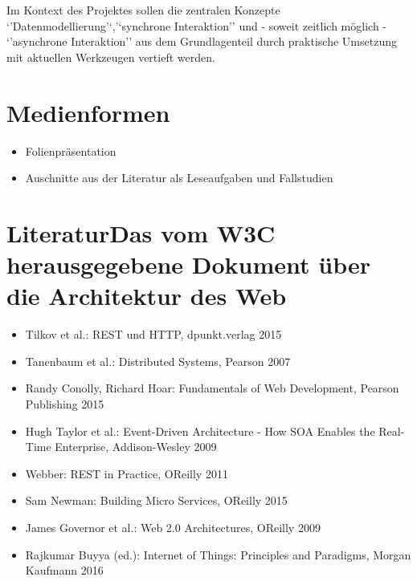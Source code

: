 Im Kontext des Projektes sollen die zentralen Konzepte
`'Datenmodellierung'`,'`synchrone Interaktion'' und - soweit zeitlich
möglich - `'asynchrone Interaktion'' aus dem Grundlagenteil durch
praktische Umsetzung mit aktuellen Werkzeugen vertieft werden.

\hypertarget{medienformenpathlabel....srcmodulbeschreibungen-bachelor-bpo5ba_web-development}{%
\section*{Medienformen\label{../../src/modulbeschreibungen-bachelor-bpo5/BA_Web-Development}}\label{medienformenpathlabel....srcmodulbeschreibungen-bachelor-bpo5ba_web-development}}

\begin{itemize}
\tightlist
\item
  Folienpräsentation
\item
  Auschnitte aus der Literatur als Leseaufgaben und Fallstudien
\end{itemize}

\hypertarget{literaturdas-vom-w3c-herausgegebene-dokument-uxfcber-die-architektur-des-webpathlabel....srcmodulbeschreibungen-bachelor-bpo5ba_web-development}{%
\section*{LiteraturDas vom W3C herausgegebene Dokument über die
Architektur des
Web\label{../../src/modulbeschreibungen-bachelor-bpo5/BA_Web-Development}}\label{literaturdas-vom-w3c-herausgegebene-dokument-uxfcber-die-architektur-des-webpathlabel....srcmodulbeschreibungen-bachelor-bpo5ba_web-development}}

\begin{itemize}
\tightlist
\item
  Tilkov et al.: REST und HTTP, dpunkt.verlag 2015
\item
  Tanenbaum et al.: Distributed Systems, Pearson 2007
\item
  Randy Conolly, Richard Hoar: Fundamentals of Web Development, Pearson
  Publishing 2015
\item
  Hugh Taylor et al.: Event-Driven Architecture - How SOA Enables the
  Real-Time Enterprise, Addison-Wesley 2009
\item
  Webber: REST in Practice, OReilly 2011
\item
  Sam Newman: Building Micro Services, OReilly 2015
\item
  James Governor et al.: Web 2.0 Architectures, OReilly 2009
\item
  Rajkumar Buyya (ed.): Internet of Things: Principles and Paradigms,
  Morgan Kaufmann 2016
\end{itemize}
